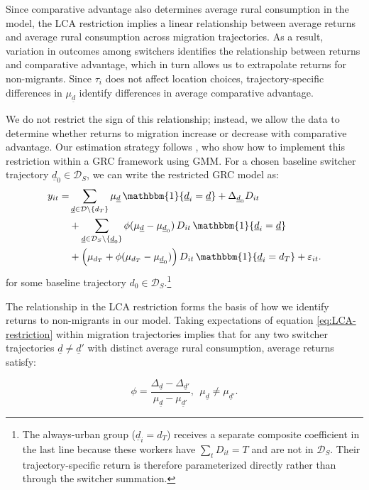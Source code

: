 Since comparative advantage also determines average rural consumption in the model, the LCA restriction implies a linear relationship between average returns and average rural consumption across migration trajectories.
As a result, variation in outcomes among switchers identifies the relationship between returns and comparative advantage, which in turn allows us to extrapolate returns for non-migrants.
Since $\tau_i$ does not affect location choices, trajectory-specific differences in $\mu_{\underline{d}}$ identify differences in average comparative advantage.

We do not restrict the sign of this relationship; instead, we allow the data to determine whether returns to migration increase or decrease with comparative advantage.
Our estimation strategy follows \cite{tjernstromCommentSuri2011}, who show how to implement this restriction within a GRC framework using GMM.
For a chosen baseline switcher trajectory $\underline d_0 \in \mathcal D_S$, we can write the restricted GRC model as:
\begin{align}
    y_{it} =& \sum_{\underline d \in \mathcal D \setminus \{d_T\}}
    \mu_{\underline d}\,\mathbbm{1}\{\underline d_i=\underline d\} + \Delta_{\underline d_0} D_{it} \nonumber \\
    & + \sum_{\underline d \in \mathcal D_S \setminus \{\underline d_0\}}
    \phi(\mu_{\underline d}-\mu_{\underline d_0})\,D_{it}\,\mathbbm{1}\{\underline d_i=\underline d\} \nonumber\\
    & + \Big(\mu_{d_T}+\phi(\mu_{d_T}-\mu_{\underline d_0})\Big)\,D_{it}\,\mathbbm{1}\{\underline d_i=d_T\} + \varepsilon_{it}.
    \label{eq:restricted-GRC}
\end{align} 
\noindent for some baseline trajectory $d_{0} \in \mathcal{D}_{S}$.\footnote{The always-urban group ($\underline d_i = d_T$) receives a separate composite coefficient in the last line because these workers have $\sum_t D_{it} = T$ and are not in $\mathcal D_S$.
Their trajectory-specific return is therefore parameterized directly rather than through the switcher summation.}

The relationship in the LCA restriction forms the basis of how we identify returns to non-migrants in our model.
Taking expectations of equation \eqref{eq:LCA-restriction} within migration trajectories implies that for any two switcher trajectories $\underline{d} \neq \underline{d}'$ with distinct average rural consumption, average returns satisfy:

\begin{equation}
    \phi = \frac{\Delta_{\underline{d}} - \Delta_{\underline{d}'}}{\mu_{\underline{d}} - \mu_{\underline{d}'}},\ \ \mu_{\underline{d}} \neq \mu_{\underline{d}'}.\label{eq:phi-proposition1}
\end{equation}

